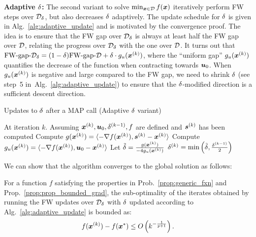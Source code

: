 %
\textbf{Adaptive $\delta$: }
The second variant to solve $\min_{\bm{x}\in\mathcal{D}} f(\bm{x})$ iteratively perform FW steps over $\mathcal{D}_{\delta}$, but also decreases $\delta$ adaptively.
The update schedule for $\delta$
is given in Alg.~\ref{alg:adaptive_update} and is motivated by the convergence proof.
The idea is to ensure that the FW gap over $\mathcal{D}_{\delta}$ is always at least half the FW gap over $\mathcal{D}$,
relating the progress over $\mathcal{D}_{\delta}$ with the one over $\mathcal{D}$. 
It turns out that $\text{FW-gap-}\mathcal{D}_{\delta} = (1-\delta) \text{FW-gap-}\mathcal{D} + \delta\cdot g_u(\bm{x}^{(k)})$, where the ``uniform gap'' $g_u(\bm{x}^{(k)})$ quantifies the decrease of the function when contracting towards $\bm{u}_0$.
%
When $g_u(\bm{x}^{(k)})$ is negative and large compared to 
the FW gap, we need to shrink $\delta$ (see step~5 in~Alg.~\ref{alg:adaptive_update}) to
ensure that the $\delta$-modified direction 
%
is a sufficient descent direction. 
%
%
%
\begin{algorithm}[t]
	\caption{Updates to $\delta$ after a MAP call (Adaptive $\delta$ variant)} 
	\label{alg:adaptive_update}
	\begin{algorithmic}[1]
	\STATE At iteration $k$. Assuming $\bm{x}^{(k)},\bm{u}_0,\delta^{(k-1)},f$ are defined and $\bm{s}^{(k)}$ has been computed
	\STATE Compute $g(\bm{x}^{(k)})=\langle-\nabla f(\bm{x}^{(k)}),\bm{s}^{(k)}-\bm{x}^{(k)}\rangle$ 
	\STATE Compute $g_u(\bm{x}^{(k)}) = \langle-\nabla f(\bm{x}^{(k)}),\bm{u}_0-\bm{x}^{(k)}\rangle$ 
		\STATE Let $\tilde{\delta} = \frac{g(\bm{x}^{(k)})}{-4g_u(\bm{x}^{(k)})}$  
				\STATE $\delta^{(k)} = \min\left(\tilde{\delta},\frac{\delta^{(k-1)}}{2}\right)$ 
			\ENDIF
		\ENDIF	{}
	\end{algorithmic}
\end{algorithm}
We can show that the algorithm converges to the global solution as follows:
\begin{theorem}
	\label{thm:convergence_adaptive_eps_main}
	For a function $f$ satisfying the properties in Prob.~\ref{prop:generic_fxn} and Prop.~\ref{prop:prop_bounded_grad}, the sub-optimality of the iterates obtained by running the FW updates over $\mathcal{D}_{\delta}$ with $\delta$ updated according to Alg.~\ref{alg:adaptive_update}
	is bounded as:
	$$f(\bm{x}^{(k)})-f(\bm{x}^{*})\leq O\left(k^{-\frac{1}{p+1}}\right).$$
\end{theorem}
